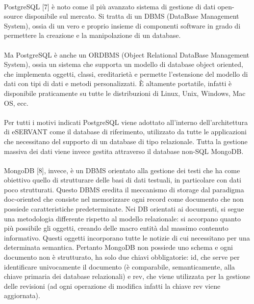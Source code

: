 \paragraph{}

PostgreSQL [7] è noto come il più avanzato sistema di gestione di dati open-source
disponibile sul mercato.
Si tratta di un DBMS (DataBase Management System), ossia di un vero e proprio insieme di componenti software in grado di permettere la creazione e la manipolazione di un database.
\paragraph{}

Ma PostgreSQL è anche un ORDBMS (Object Relational DataBase Management System), ossia un sistema che supporta un modello di database object oriented, che implementa oggetti, classi, ereditarietà e permette l’estensione del modello di dati con tipi di dati e metodi
personalizzati.
È altamente portatile, infatti è disponibile praticamente su tutte le distribuzioni di Linux, Unix, Windows, Mac OS, ecc.
\paragraph{}

Per tutti i motivi indicati PostgreSQL viene adottato all’interno dell’architettura di eSERVANT come il database di riferimento, utilizzato da tutte le applicazioni che necessitano del supporto di un database di tipo relazionale.
Tutta la gestione massiva dei dati viene invece gestita attraverso il database non-SQL
MongoDB.

\paragraph{}
MongoDB [8], invece, è un DBMS orientato alla gestione dei testi che ha come obiettivo quello di strutturare delle basi di dati testuali, in particolare con dati poco strutturati.
Questo DBMS eredita il meccanismo di storage dal paradigma doc-oriented che consiste nel memorizzare ogni record come documento che non possiede caratteristiche predeterminate.
Nei DB orientati ai documenti, si segue una metodologia differente rispetto al modello relazionale: si accorpano quanto più possibile gli oggetti, creando delle macro entità dal massimo contenuto informativo. Questi oggetti incorporano tutte le notizie di cui necessitano per una determinata semantica.
Pertanto MongoDB non possiede uno schema e ogni documento non è strutturato, ha solo due chiavi obbligatorie:
id, che serve per identificare univocamente il documento (è comparabile, semanticamente, alla chiave primaria dei database relazionali)
e rev, che viene utilizzata per la gestione delle revisioni (ad ogni operazione di modifica infatti la chiave rev viene aggiornata).
